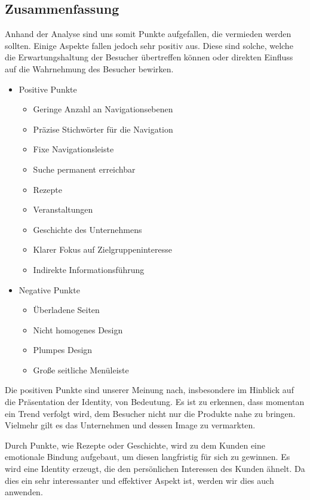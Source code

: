 \documentclass[12pt,a4paper,oneside,ngerman]{article}
\begin{document}
\subsection{Zusammenfassung}
Anhand der Analyse sind uns somit Punkte aufgefallen, die vermieden werden sollten. Einige Aspekte fallen jedoch sehr positiv aus. Diese sind solche, welche die Erwartungshaltung der Besucher übertreffen können oder direkten Einfluss auf die Wahrnehmung des Besucher bewirken.


\begin{itemize}
\item{Positive Punkte}	
\begin{itemize} %
	\item{Geringe Anzahl an Navigationsebenen}
	\item{Präzise Stichwörter für die Navigation}
	\item{Fixe Navigationsleiste}
	\item{Suche permanent erreichbar}
	\item{Rezepte}
	\item{Veranstaltungen}
	\item{Geschichte des Unternehmens}
	\item{Klarer Fokus auf Zielgruppeninteresse}
	\item{Indirekte Informationsführung}
\end{itemize}
\end{itemize}


\begin{itemize}
\item{Negative Punkte}	
\begin{itemize} %
	\item{Überladene Seiten}
	\item{Nicht homogenes Design}
	\item{Plumpes Design}
	\item{Große seitliche Menüleiste}
\end{itemize}
\end{itemize}

Die positiven Punkte sind unserer Meinung nach, insbesondere im Hinblick auf die Präsentation der Identity, von Bedeutung. Es ist zu erkennen, dass momentan ein Trend verfolgt wird, dem Besucher nicht nur die Produkte nahe zu bringen. Vielmehr gilt es das Unternehmen und dessen Image zu vermarkten. 

Durch Punkte, wie Rezepte oder Geschichte, wird zu dem Kunden eine emotionale Bindung aufgebaut, um diesen langfristig für sich zu gewinnen. 
Es wird eine Identity erzeugt, die den persönlichen Interessen des Kunden ähnelt.
Da dies ein sehr interessanter und effektiver Aspekt ist, werden wir dies auch anwenden.
\end{document}
